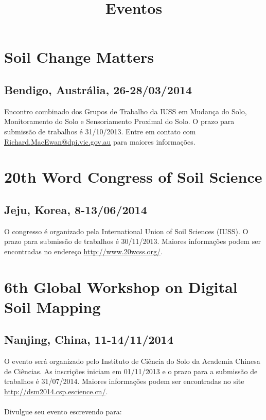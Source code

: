 \title{Eventos}
\maketitle
\section{Soil Change Matters}
\subsection{Bendigo, Austrália, 26-28/03/2014}
Encontro combinado dos Grupos de Trabalho da IUSS em Mudança do Solo, Monitoramento do Solo e Sensoriamento Proximal do Solo. O prazo para submissão de trabalhos é 31/10/2013. Entre em contato com \href{mailto:Richard.MacEwan@dpi.vic.gov.au}{Richard.MacEwan@dpi.vic.gov.au} para maiores informações.
\section{20th Word Congress of Soil Science}
\subsection{Jeju, Korea, 8-13/06/2014}
O congresso é organizado pela International Union of Soil Sciences (IUSS). O prazo para submissão de trabalhos é 30/11/2013.
Maiores informações podem ser encontradas no endereço \url{http://www.20wcss.org/}.
\section{6th Global Workshop on Digital Soil Mapping}
\subsection{Nanjing, China, 11-14/11/2014}
O evento será organizado pelo Instituto de Ciência do Solo da Academia Chinesa de Ciências. As inscrições iniciam em 01/11/2013 e o prazo para a submissão de trabalhos é 31/07/2014. Maiores informações podem ser encontradas no site \url{http://dsm2014.csp.escience.cn/}.\\
\\
Divulgue seu evento escrevendo para:\\
\address{Jean Michel Moura-Bueno\\
  Universidade Federal de Santa Maria\\
  }


